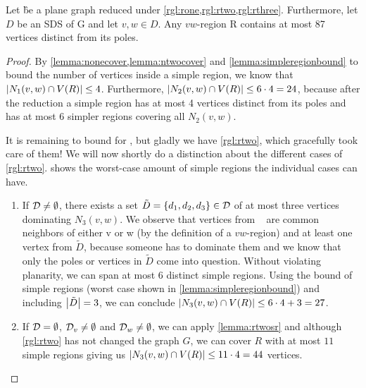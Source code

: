 \begin{lemma}\label{lemma:inside}
    Let \G be a plane graph reduced under \cref{rgl:rone,rgl:rtwo,rgl:rthree}. Furthermore, let $D$ be an SDS of G and let $v,w \in D$. Any $vw$-region R contains at most 87 vertices distinct from its poles.
\end{lemma}
\begin{proof} 
    By \cref{lemma:nonecover,lemma:ntwocover} and \cref{lemma:simpleregionbound} to bound the number of vertices inside a simple region, we know that $\abs{N_1(v,w) \cap V(R)} \leq 4$. Furthermore, $\abs{N_2(v,w) \cap V(R)} \leq 6 \cdot 4 = 24$, because after the reduction a simple region has at most 4 vertices distinct from its poles and has at most 6 simpler regions covering all $N_2(v, w)$.
    
    It is remaining to bound for \nthi, but gladly we have \cref{rgl:rtwo}, which gracefully took care of them! We will now shortly do a distinction about the different cases of \cref{rgl:rtwo}.  shows the worst-case amount of simple regions the individual cases can have.
    
    \begin{caseofz}

        \begin{enumerate}
            \item If $\mathcal{D} \neq \emptyset$, there exists a set $\tilde D = \{d_1,d_2,d_3\} \in \mathcal{D}$ of at most three vertices dominating $N_3(v,w)$. We observe that vertices from \nthi~ are common neighbors of either v or w (by the definition of a $vw$-region) and at least one vertex from $\tilde D$, because someone has to dominate them and we know that only the poles or vertices in $\tilde D$ come into question.
            Without violating planarity, we can span at most 6 distinct simple regions. Using the bound of simple regions (worst case shown in \cref{lemma:simpleregionbound}) and including $\abs{\tilde D} = 3$, we can conclude $\abs{N_3(v,w) \cap V(R)} \leq 6 \cdot 4 + 3 = 27$.
            \item If $\mathcal{D} = \emptyset$, $\mathcal{D}_{v} \neq \emptyset$ and $\mathcal{D}_{w} \neq \emptyset$, we can apply \cref{lemma:rtwosr} and although \cref{rgl:rtwo} has not changed the graph $G$, we can cover $R$ with at most $11$ simple regions giving us $\abs{N_3(v,w) \cap V(R)} \leq 11 \cdot 4 = 44$ vertices.
        \end{enumerate}
        

\end{caseofz}
\end{proof}
